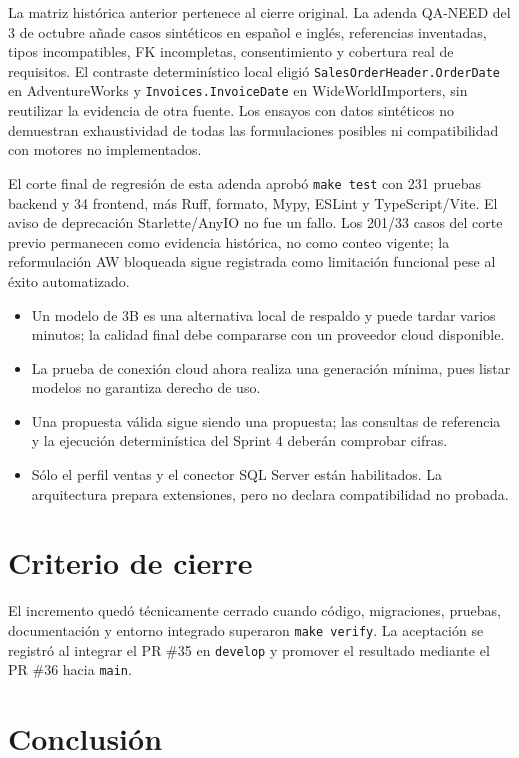 \documentclass[11pt,letterpaper]{article}
\newcommand{\file}[1]{\texttt{#1}}
\begin{document}
La matriz histórica anterior pertenece al cierre original. La adenda QA-NEED del
3 de octubre añade casos sintéticos en español e inglés, referencias inventadas,
tipos incompatibles, FK incompletas, consentimiento y cobertura real de requisitos.
El contraste determinístico local eligió \file{SalesOrderHeader.OrderDate} en
AdventureWorks y \file{Invoices.InvoiceDate} en WideWorldImporters, sin reutilizar la
evidencia de otra fuente. Los ensayos con datos sintéticos no demuestran exhaustividad
de todas las formulaciones posibles ni compatibilidad con motores no implementados.

El corte final de regresión de esta adenda aprobó \file{make test} con 231 pruebas
backend y 34 frontend, más Ruff, formato, Mypy, ESLint y TypeScript/Vite. El aviso
de deprecación Starlette/AnyIO no fue un fallo. Los 201/33 casos del corte previo
permanecen como evidencia histórica, no como conteo vigente; la reformulación AW
bloqueada sigue registrada como limitación funcional pese al éxito automatizado.

\begin{itemize}
  \item Un modelo de 3B es una alternativa local de respaldo y puede tardar varios minutos; la calidad final debe compararse con un proveedor cloud disponible.
  \item La prueba de conexión cloud ahora realiza una generación mínima, pues listar modelos no garantiza derecho de uso.
  \item Una propuesta válida sigue siendo una propuesta; las consultas de referencia y la ejecución determinística del Sprint 4 deberán comprobar cifras.
  \item Sólo el perfil ventas y el conector SQL Server están habilitados. La arquitectura prepara extensiones, pero no declara compatibilidad no probada.
\end{itemize}

\section{Criterio de cierre}

El incremento quedó técnicamente cerrado cuando código, migraciones, pruebas, documentación y entorno integrado superaron \file{make verify}. La aceptación se registró al integrar el PR \#35 en \file{develop} y promover el resultado mediante el PR \#36 hacia \file{main}.

\section{Conclusión}
\end{document}

